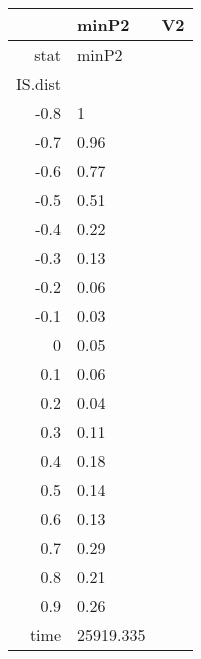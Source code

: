 \begin{table}[ht]
\centering
\begingroup\tiny
\begin{tabular}{rll}
  \hline
 & minP2 & V2 \\ 
  \hline
stat & minP2 &  \\ 
  IS.dist &  &  \\ 
  -0.8 & 1 &  \\ 
  -0.7 & 0.96 &  \\ 
  -0.6 & 0.77 &  \\ 
  -0.5 & 0.51 &  \\ 
  -0.4 & 0.22 &  \\ 
  -0.3 & 0.13 &  \\ 
  -0.2 & 0.06 &  \\ 
  -0.1 & 0.03 &  \\ 
  0 & 0.05 &  \\ 
  0.1 & 0.06 &  \\ 
  0.2 & 0.04 &  \\ 
  0.3 & 0.11 &  \\ 
  0.4 & 0.18 &  \\ 
  0.5 & 0.14 &  \\ 
  0.6 & 0.13 &  \\ 
  0.7 & 0.29 &  \\ 
  0.8 & 0.21 &  \\ 
  0.9 & 0.26 &  \\ 
  time & 25919.335 &  \\ 
   \hline
\end{tabular}
\endgroup
\end{table}
